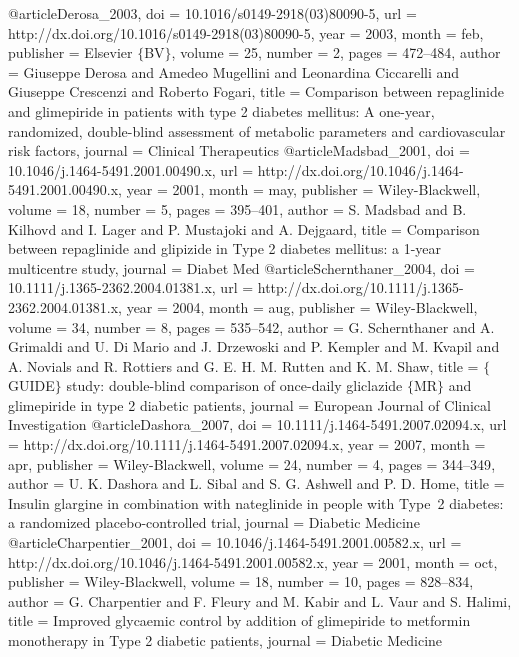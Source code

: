 @article{Derosa_2003,
	doi = {10.1016/s0149-2918(03)80090-5},
	url = {http://dx.doi.org/10.1016/s0149-2918(03)80090-5},
	year = 2003,
	month = {feb},
	publisher = {Elsevier $\lbrace$BV$\rbrace$},
	volume = {25},
	number = {2},
	pages = {472--484},
	author = {Giuseppe Derosa and Amedeo Mugellini and Leonardina Ciccarelli and Giuseppe Crescenzi and Roberto Fogari},
	title = {Comparison between repaglinide and glimepiride in patients with type 2 diabetes mellitus: A one-year, randomized, double-blind assessment of metabolic parameters and cardiovascular risk factors},
	journal = {Clinical Therapeutics}
}
@article{Madsbad_2001,
	doi = {10.1046/j.1464-5491.2001.00490.x},
	url = {http://dx.doi.org/10.1046/j.1464-5491.2001.00490.x},
	year = 2001,
	month = {may},
	publisher = {Wiley-Blackwell},
	volume = {18},
	number = {5},
	pages = {395--401},
	author = {S. Madsbad and B. Kilhovd and I. Lager and P. Mustajoki and A. Dejgaard},
	title = {Comparison between repaglinide and glipizide in Type 2 diabetes mellitus: a 1-year multicentre study},
	journal = {Diabet Med}
}
@article{Schernthaner_2004,
	doi = {10.1111/j.1365-2362.2004.01381.x},
	url = {http://dx.doi.org/10.1111/j.1365-2362.2004.01381.x},
	year = 2004,
	month = {aug},
	publisher = {Wiley-Blackwell},
	volume = {34},
	number = {8},
	pages = {535--542},
	author = {G. Schernthaner and A. Grimaldi and U. Di Mario and J. Drzewoski and P. Kempler and M. Kvapil and A. Novials and R. Rottiers and G. E. H. M. Rutten and K. M. Shaw},
	title = {$\lbrace$GUIDE$\rbrace$ study: double-blind comparison of once-daily gliclazide $\lbrace$MR$\rbrace$ and glimepiride in type 2 diabetic patients},
	journal = {European Journal of Clinical Investigation}
}
@article{Dashora_2007,
	doi = {10.1111/j.1464-5491.2007.02094.x},
	url = {http://dx.doi.org/10.1111/j.1464-5491.2007.02094.x},
	year = 2007,
	month = {apr},
	publisher = {Wiley-Blackwell},
	volume = {24},
	number = {4},
	pages = {344--349},
	author = {U. K. Dashora and L. Sibal and S. G. Ashwell and P. D. Home},
	title = {Insulin glargine in combination with nateglinide in people with Type~2 diabetes: a randomized placebo-controlled trial},
	journal = {Diabetic Medicine}
}
@article{Charpentier_2001,
	doi = {10.1046/j.1464-5491.2001.00582.x},
	url = {http://dx.doi.org/10.1046/j.1464-5491.2001.00582.x},
	year = 2001,
	month = {oct},
	publisher = {Wiley-Blackwell},
	volume = {18},
	number = {10},
	pages = {828--834},
	author = {G. Charpentier and F. Fleury and M. Kabir and L. Vaur and S. Halimi},
	title = {Improved glycaemic control by addition of glimepiride to metformin monotherapy in Type 2 diabetic patients},
	journal = {Diabetic Medicine}
}
